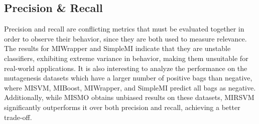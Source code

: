\documentclass[reqno]{vcuthesis}
\numberwithin{equation}{chapter}
\begin{document}
\subsection{Precision \& Recall}
Precision and recall are conflicting metrics that must be evaluated together in order to observe their behavior, since they are both used to measure relevance. The results for MIWrapper and SimpleMI indicate that they are unstable classifiers, exhibiting extreme variance in behavior, making them unsuitable for real-world applications. It is also interesting to analyze the performance on the mutagenesis datasets which have a larger number of positive bags than negative, where MISVM, MIBoost, MIWrapper, and SimpleMI predict all bags as negative. Additionally, while MISMO obtains unbiased results on these datasets, MIRSVM significantly outperforms it over both precision and recall, achieving a better trade-off.  
\end{document}
